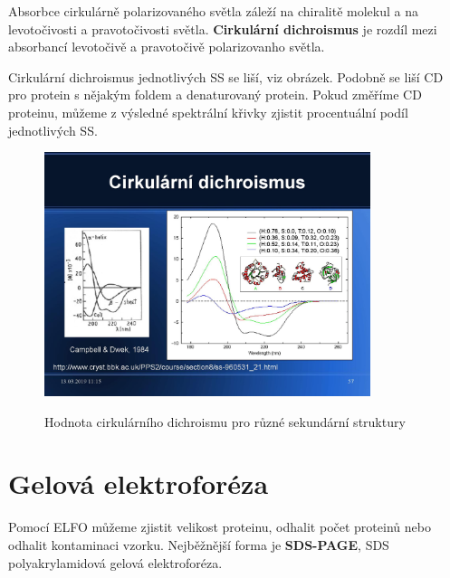 \documentclass[DIV=8]{scrreprt}
\begin{document}
Absorbce cirkulárně polarizovaného světla záleží na chiralitě molekul a na levotočivosti a pravotočivosti světla. \textbf{Cirkulární dichroismus} je rozdíl mezi absorbancí levotočivě a pravotočivě polarizovanho světla.

Cirkulární dichroismus jednotlivých SS se liší, viz obrázek. Podobně se liší CD pro protein s nějakým foldem a denaturovaný protein. Pokud změříme CD proteinu, můžeme z výsledné spektrální křivky zjistit procentuální podíl jednotlivých SS.

\begin{figure}
    \caption{Hodnota cirkulárního dichroismu pro různé sekundární struktury}
    \includegraphics[width=0.85\textwidth]{slides-2/slide-55.jpg}
    \centering
    \label{}
\end{figure}


\section{Gelová elektroforéza} \label{Gelová elektroforéza}


Pomocí ELFO můžeme zjistit velikost proteinu, odhalit počet proteinů nebo odhalit kontaminaci vzorku. Nejběžnější forma je \textbf{SDS-PAGE}, SDS polyakrylamidová gelová elektroforéza.
\end{document}
